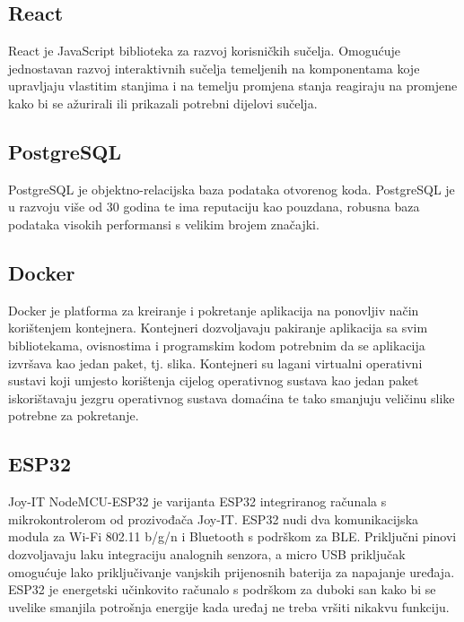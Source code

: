 \documentclass[times, utf8, diplomski]{fer}
\begin{document}
\subsection{React}
React\citep{React} je JavaScript biblioteka za razvoj korisničkih sučelja. Omogućuje jednostavan razvoj interaktivnih sučelja temeljenih na komponentama koje upravljaju vlastitim stanjima i na temelju promjena stanja reagiraju na promjene kako bi se ažurirali ili prikazali potrebni dijelovi sučelja.

\subsection{PostgreSQL}
PostgreSQL\citep{PostgreSQL} je objektno-relacijska baza podataka otvorenog koda. PostgreSQL je u razvoju više od 30 godina te ima reputaciju kao pouzdana, robusna baza podataka visokih performansi s velikim brojem značajki. 

\subsection{Docker}
Docker\citep{Docker} je platforma za kreiranje i pokretanje aplikacija na ponovljiv način korištenjem kontejnera. Kontejneri dozvoljavaju pakiranje aplikacija sa svim bibliotekama, ovisnostima i programskim kodom potrebnim da se aplikacija izvršava kao jedan paket, tj. slika. Kontejneri su lagani virtualni operativni sustavi koji umjesto korištenja cijelog operativnog sustava kao jedan paket iskorištavaju jezgru operativnog sustava domaćina te tako smanjuju veličinu slike potrebne za pokretanje.

\subsection{ESP32}
Joy-IT NodeMCU-ESP32\citep{ESP32Img} je varijanta ESP32 integriranog računala s mikrokontrolerom od prozivođača Joy-IT. ESP32 nudi dva komunikacijska modula za Wi-Fi 802.11 b/g/n i Bluetooth s podrškom za BLE. Priključni pinovi dozvoljavaju laku integraciju analognih senzora, a micro USB priključak omogućuje lako priključivanje vanjskih prijenosnih baterija za napajanje uređaja. ESP32 je energetski učinkovito računalo s podrškom za duboki san kako bi se uvelike smanjila potrošnja energije kada uređaj ne treba vršiti nikakvu funkciju.

\newpage
\end{document}
